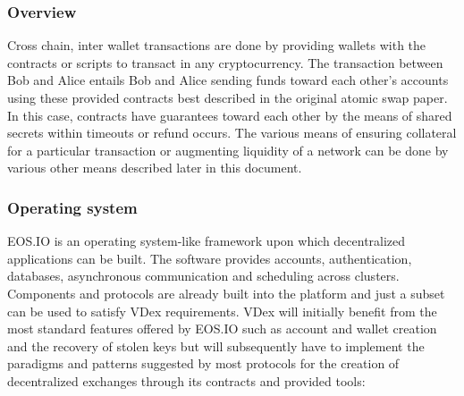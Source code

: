 \documentclass[]{article}
\begin{document}
	\subsubsection{Overview}
	Cross chain, inter wallet transactions are done by providing wallets with the contracts or scripts to transact in any cryptocurrency. The transaction between Bob and Alice entails Bob and Alice sending funds toward each other's accounts using these provided contracts best described in the original atomic swap paper.\cite{22} In this case, contracts have guarantees toward each other by the means of shared secrets within timeouts or refund occurs. The various means of ensuring collateral for a particular transaction or augmenting liquidity of a network can be done by various other means described later in this document.
	
	\subsubsection{Operating system}
	EOS.IO is an operating system-like framework upon which decentralized applications can be built. The software provides accounts, authentication, databases, asynchronous communication and scheduling across clusters. Components and protocols are already built into the platform and just a subset can be used to satisfy VDex requirements. VDex will initially benefit from the most standard features offered by EOS.IO such as account and wallet creation and the recovery of stolen keys but will subsequently have to implement the paradigms and patterns suggested by most protocols for the creation of decentralized exchanges through its contracts and provided tools:	\cite{3}\\
  
\end{document}
